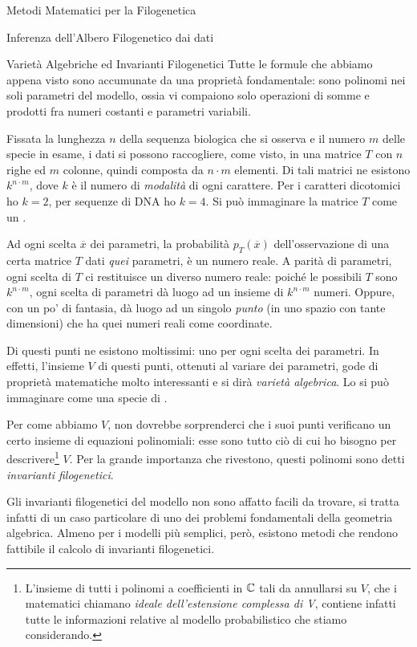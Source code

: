 \documentclass{article}
\begin{document}
\begin{section}{Metodi Matematici per la Filogenetica}
\begin{subsection}{Inferenza dell’Albero Filogenetico dai dati}
		\end{subsection}
		
		\begin{subsection}{Varietà Algebriche ed Invarianti Filogenetici}
			Tutte le formule che abbiamo appena visto sono accumunate da una proprietà fondamentale: sono polinomi nei soli parametri del modello, ossia vi compaiono solo operazioni di somme e prodotti fra numeri costanti e parametri variabili.
			
			Fissata la lunghezza $n$ della sequenza biologica che si osserva e il numero $m$ delle specie in esame, i dati si possono raccogliere, come visto, in una matrice $T$ con $n$ righe ed $m$ colonne, quindi composta da $n\cdot m$ elementi. 
			Di tali matrici ne esistono $k^{n\cdot m}$, dove $k$ è il numero di \emph{modalità} di ogni carattere. Per i caratteri dicotomici ho $k = 2$, per sequenze di DNA ho $k = 4$. Si può immaginare la matrice $T$ come un .
			
			Ad ogni scelta $\overline{x}$ dei parametri, la probabilità $p_{T}(\overline{x})$ dell’osservazione di una certa matrice $T$ dati \emph{quei} parametri, è un numero reale. A parità di parametri, ogni scelta di $T$ ci restituisce un diverso numero reale: poiché le possibili $T$ sono $k^{n\cdot m}$, ogni scelta di parametri dà luogo ad un insieme di $k^{n\cdot m}$ numeri. Oppure, con un po' di fantasia, dà luogo ad un singolo \emph{punto} (in uno spazio con tante dimensioni) che ha quei numeri reali come coordinate. 
			
			Di questi punti ne esistono moltissimi: uno per ogni scelta dei parametri. In effetti, l'insieme $V$ di questi punti, ottenuti al variare dei parametri, gode di proprietà matematiche molto interessanti e si dirà \emph{varietà algebrica}. Lo si può immaginare come una specie di .
			
			Per come abbiamo  $V$, non dovrebbe sorprenderci che i suoi punti verificano un certo insieme di equazioni polinomiali: esse sono tutto ciò di cui ho bisogno per descrivere\footnote{L’insieme di tutti i polinomi a coefficienti in $\mathbb{C}$ tali da annullarsi su $V$, che i matematici chiamano \emph{ideale dell’estensione complessa di V}, contiene infatti tutte le informazioni relative al modello probabilistico che stiamo considerando.} $V$. Per la grande importanza che rivestono, questi polinomi sono detti \emph{invarianti filogenetici}.
			
			Gli invarianti filogenetici del modello non sono affatto facili da trovare, si tratta infatti di un caso particolare di uno dei problemi fondamentali della geometria algebrica. Almeno per i modelli più semplici, però, esistono metodi che rendono fattibile il calcolo di invarianti filogenetici.
			

\end{subsection}
\end{section}
\end{document}

